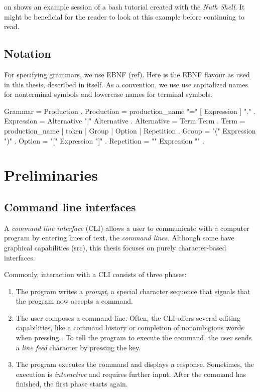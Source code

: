 \documentclass[paper=a4,twoside,abstract=on,cleardoublepage=empty,numbers=noenddot,toc=bib,12pt,appendixprefix=true]{scrreprt}
\begin{document}
 on  shows an example session of a bash tutorial created with the \emph{Nuth Shell}. It might be beneficial for the reader to look at this example before continuing to read.

\section{Notation}
\label{sec:ebnf}

For specifying grammars, we use EBNF (ref). Here is the EBNF flavour as used in this thesis, described in itself.
As a convention, we use use capitalized names for nonterminal symbols and lowercase names for terminal symbols.

\begin{ebnf}
Grammar     = { Production } .
Production  = production_name "=" [ Expression ] "." .
Expression  = Alternative { "|" Alternative } .
Alternative = Term { Term } .
Term        = production_name | token | Group | Option | Repetition .
Group       = "(" Expression ")" .
Option      = "[" Expression "]" .
Repetition  = "{" Expression "}" .
\end{ebnf}

\chapter{Preliminaries}
\label{sec:preliminaries}

\section{Command line interfaces}
\label{sec:cli}

A \emph{command line interface} (\textsc{CLI}) allows a user to communicate with a computer program by entering lines of text, the \emph{command lines}. Although some have graphical capabilities (src), this thesis focuses on purely character-based interfaces.

Commonly, interaction with a \textsc{CLI} consists of three phases:

\begin{enumerate}
    \item The program writes a \emph{prompt}, a special character sequence that signals that the program now accepts a command.
    \item The user composes a command line. Often, the CLI offers several editing capabilities, like a command history or completion of nonambigious words when pressing . To tell the program to execute the command, the user sends a \emph{line feed} character by pressing the  key.
    \item The program executes the command and displays a response. Sometimes, the execution is \emph{interactive} and requires further input. After the command has finished, the first phase starts again.
\end{enumerate}
\end{document}
